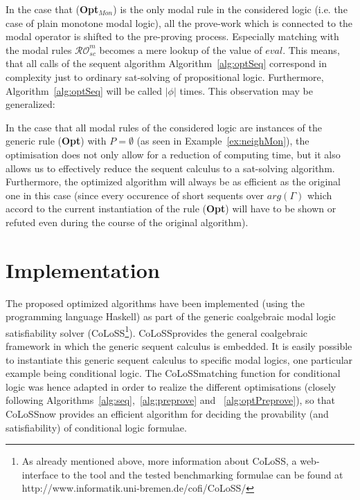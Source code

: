 \documentclass{entcs} \usepackage{entcsmacro}
\newcommand{\COLOSS}{{\textrm CoLoSS}}
\begin{document}
\begin{example}
\begin{enumerate}
In the case that (\textbf{Opt}$_{Mon}$) is the only modal rule in the
considered logic (i.e. the case of plain monotone modal logic), all the
prove-work which is connected to the modal operator is shifted to the
pre-proving process. Especially matching with the modal rules
$\mathcal{RO}^m_{sc}$ becomes a mere lookup of the value of $eval$.
This means, that all calls of the sequent algorithm Algorithm~\ref{alg:optSeq}
correspond in complexity just to ordinary sat-solving of propositional logic.
Furthermore, Algorithm~\ref{alg:optSeq} will be called $|\phi|$ times. This
observation may be generalized:
\end{enumerate}
\label{ex:neighMon}
\end{example}

\begin{remark}
In the case that all modal rules of the considered logic are instances of
the generic rule (\textbf{Opt}) with $P=\emptyset$ (as seen in Example~\ref{ex:neighMon}),
the optimisation does not only allow for a reduction of computing time, but
it also allows us to effectively reduce the sequent calculus to a sat-solving
algorithm.
Furthermore, the optimized algorithm will always be as efficient as the
original one in this case (since every occurence of short sequents over $arg(\Gamma)$ 
which accord to the current instantiation of the rule (\textbf{Opt}) will
have to be shown or refuted even during the course of the original algorithm).
\end{remark}

\section{Implementation}

The proposed optimized algorithms have been implemented (using the programming
language Haskell) as part of the generic coalgebraic modal logic satisfiability
solver (\COLOSS\footnote{As already mentioned above, more information about \COLOSS,
a web-interface to the tool and 
the tested benchmarking formulae can be found at http://www.informatik.uni-bremen.de/cofi/CoLoSS/}).
\COLOSS provides the general coalgebraic framework in which the generic
sequent calculus is embedded. It is easily possible to instantiate this generic sequent
calculus to specific modal logics, one particular example being conditional logic.
The \COLOSS matching function for conditional logic was hence adapted in order to realize
the different optimisations (closely following Algorithms~\ref{alg:seq},~\ref{alg:preprove} and
~\ref{alg:optPreprove}), so that \COLOSS now provides an efficient algorithm for
deciding the provability (and satisfiability) of conditional logic formulae.
\end{document}
